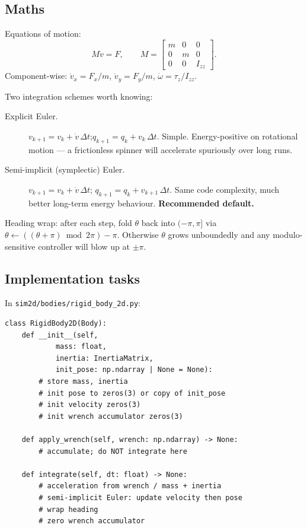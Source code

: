 \documentclass[11pt,a4paper]{article}
\newcommand{\file}[1]{\texttt{\small #1}}
\begin{document}
\subsection*{Maths}

Equations of motion:
\begin{equation}
    M\dot{v} = F, \qquad
    M = \begin{bmatrix} m & 0 & 0 \\ 0 & m & 0 \\ 0 & 0 & I_{zz} \end{bmatrix}.
    \label{eq:eom}
\end{equation}
Component-wise: $\dot{v}_x = F_x/m$, $\dot{v}_y = F_y/m$, $\dot{\omega} = \tau_z/I_{zz}$.

Two integration schemes worth knowing:
\begin{description}
    \item[Explicit Euler.] $v_{k+1} = v_k + \dot{v}\, \Delta t$;\quad $q_{k+1} = q_k + v_k\, \Delta t$.
        Simple. Energy-positive on rotational motion --- a frictionless spinner will accelerate
        spuriously over long runs.
    \item[Semi-implicit (symplectic) Euler.] $v_{k+1} = v_k + \dot{v}\, \Delta t$;\quad
        $q_{k+1} = q_k + v_{k+1}\, \Delta t$. Same code complexity, much
        better long-term energy behaviour. \textbf{Recommended default.}
\end{description}
Heading wrap: after each step, fold $\theta$ back into $(-\pi, \pi]$ via
$\theta \leftarrow ((\theta + \pi) \bmod 2\pi) - \pi$. Otherwise $\theta$
grows unboundedly and any modulo-sensitive controller will blow up at
$\pm \pi$.

\subsection*{Implementation tasks}

In \file{sim2d/bodies/rigid\_body\_2d.py}:

\begin{lstlisting}
class RigidBody2D(Body):
    def __init__(self,
            mass: float,
            inertia: InertiaMatrix,
            init_pose: np.ndarray | None = None):
        # store mass, inertia
        # init pose to zeros(3) or copy of init_pose
        # init velocity zeros(3)
        # init wrench accumulator zeros(3)

    def apply_wrench(self, wrench: np.ndarray) -> None:
        # accumulate; do NOT integrate here

    def integrate(self, dt: float) -> None:
        # acceleration from wrench / mass + inertia
        # semi-implicit Euler: update velocity then pose
        # wrap heading
        # zero wrench accumulator
\end{lstlisting}
\end{document}

